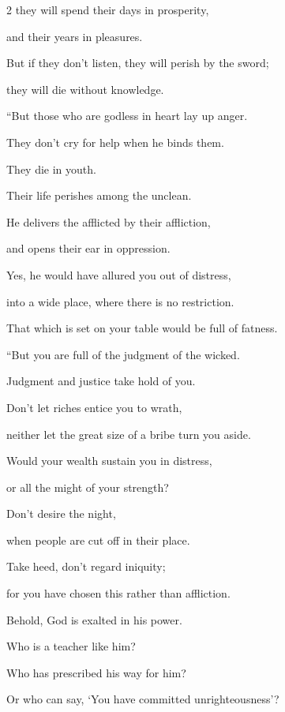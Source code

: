 \begin{multicols}{2}
	they will spend their days in prosperity,
	
	and their years in pleasures.
	
	\myverse{}But if they don’t listen, they will perish by the sword;
	
	they will die without knowledge.
	
	\vspace{\baselineskip}
	
	\myverse{}“But those who are godless in heart lay up anger.
	
	They don’t cry for help when he binds them.
	
	\myverse{}They die in youth.
	
	Their life perishes among the unclean.
	
	\myverse{}He delivers the afflicted by their affliction,
	
	and opens their ear in oppression.
	
	\myverse{}Yes, he would have allured you out of distress,
	
	into a wide place, where there is no restriction.
	
	That which is set on your table would be full of fatness.
	
	\vspace{\baselineskip}
	
	\myverse{}“But you are full of the judgment of the wicked.
	
	Judgment and justice take hold of you.
	
	\myverse{}Don’t let riches entice you to wrath,
	
	neither let the great size of a bribe turn you aside.
	
	\myverse{}Would your wealth sustain you in distress,
	
	or all the might of your strength?
	
	\myverse{}Don’t desire the night,
	
	when people are cut off in their place.
	
	\myverse{}Take heed, don’t regard iniquity;
	
	for you have chosen this rather than affliction.
	
	\myverse{}Behold, God is exalted in his power.
	
	Who is a teacher like him?
	
	\myverse{}Who has prescribed his way for him?
	
	Or who can say, ‘You have committed unrighteousness’?
	

\end{multicols}
